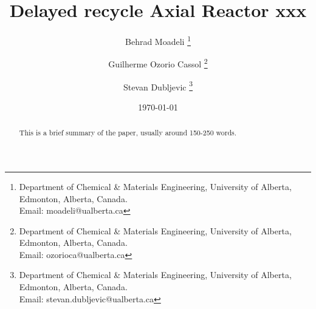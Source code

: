 \documentclass[letterpaper,11pt]{article}
\title{Delayed recycle Axial Reactor xxx}
\author{
  Behrad Moadeli \thanks{Department of Chemical \& Materials Engineering, University of Alberta, Edmonton, Alberta, Canada. \\Email: moadeli@ualberta.ca} \and
  Guilherme Ozorio Cassol \thanks{Department of Chemical \& Materials Engineering, University of Alberta, Edmonton, Alberta, Canada. \\Email: ozorioca@ualberta.ca} \and
  Stevan Dubljevic \thanks{Department of Chemical \& Materials Engineering, University of Alberta, Edmonton, Alberta, Canada. \\Email: stevan.dubljevic@ualberta.ca}
}
\date{\today}
\begin{document}
\maketitle

\begin{abstract}
    This is a brief summary of the paper, usually around 150-250 words. \lipsum[1-1]
\end{abstract}

\newpage
\tableofcontents
\newpage


  
  
  
  
  
  
  
  

  
  
  \printbibliography

\end{document}
